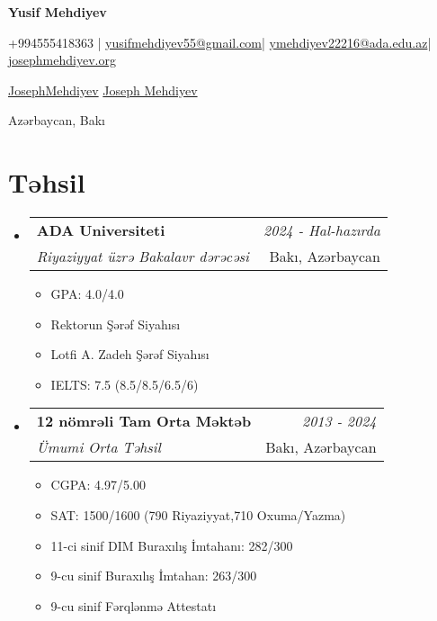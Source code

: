 \documentclass[a4paper,11pt]{article}
\makeatletter
\newcommand{\resumeSubheading}[4]{
    \vspace{0.5mm}
\item
    \begin{tabular*}{0.98\textwidth}[t]{l@{\extracolsep{\fill}}r}
        \textbf{#1} & \textit{\footnotesize{#4}} \\
        \textit{\footnotesize{#3}} &  \footnotesize{#2}\\
    \end{tabular*}
    \vspace{-2.4mm}
}
\newcommand{\resumeSubHeadingListStart}{
\begin{itemize}[leftmargin=*,labelsep=1mm]}
\newcommand{\resumeItemListStart}{
                \begin{itemize}[leftmargin=*,labelsep=1mm,itemsep=0.5mm]}
\newcommand{\resumeSubHeadingListEnd}{
                    \end{itemize}\vspace{2mm}}
\newcommand{\resumeItemListEnd}{
    \end{itemize}\vspace{-2mm}}
\newcommand{\socialicon}[1]{\raisebox{-0.05em}{\resizebox{!}{1em}{#1}}}
\newcommand{\headerfontiii}{\fontfamily{ppl}\selectfont} %
\makeatother
\begin{document}
\headerfontiii

\begin{center}
    {\Huge\textbf{Yusif Mehdiyev}}
\end{center}
\vspace{-5mm}

\begin{center}
    \small{
        +994555418363 | \href{mailto:yusifmehdiyev55@gmail.com}{yusifmehdiyev55@gmail.com}|
        \href{mailto:ymehdiyev22216@ada.edu.az}{ymehdiyev22216@ada.edu.az}|
        \href{https://josephmehdiyev.org/}{josephmehdiyev.org}
    }
\end{center}
\vspace{-5mm}

\begin{center}
    \small{
        \socialicon{\faGithub} \href{https://github.com/JosephMehdiyev}{JosephMehdiyev}
        \socialicon{\faLinkedin} \href{https://www.linkedin.com/in/joseph-mehdiyev-6155982ab/} {Joseph Mehdiyev}
    }
\end{center}
\vspace{-5mm}
\begin{center}
    \small{Azərbaycan, Bakı}
\end{center}

\section{\textbf{Təhsil}}
\resumeSubHeadingListStart

\resumeSubheading
{ADA Universiteti}{Bakı, Azərbaycan}
{Riyaziyyat üzrə Bakalavr dərəcəsi}{2024 - Hal-hazırda}
\resumeItemListStart
\item GPA: 4.0/4.0
\item Rektorun Şərəf Siyahısı
\item Lotfi A. Zadeh Şərəf Siyahısı
\item IELTS: 7.5 (8.5/8.5/6.5/6)
\resumeItemListEnd

\resumeSubheading
{12 nömrəli Tam Orta Məktəb}{Bakı, Azərbaycan}
{Ümumi Orta Təhsil}{2013 - 2024}
\resumeItemListStart
\item CGPA: 4.97/5.00
\item SAT: 1500/1600 (790 Riyaziyyat,710 Oxuma/Yazma)
\item 11-ci sinif DIM Buraxılış İmtahanı: 282/300
\item 9-cu sinif Buraxılış İmtahan: 263/300
\item 9-cu sinif Fərqlənmə Attestatı
\resumeItemListEnd
\resumeSubHeadingListEnd
\end{document}
